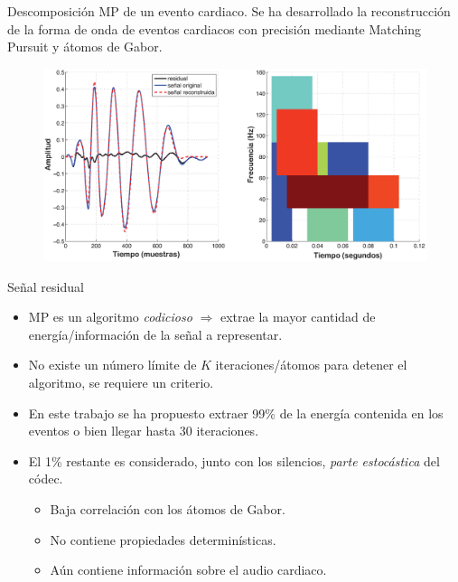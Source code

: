 \documentclass[xcolor=table]{beamer}
\begin{document}
\begin{frame}{Descomposici\'on MP de un evento cardiaco.}
Se ha desarrollado la reconstrucci\'on de la forma de onda de eventos cardiacos 
con precisi\'on mediante Matching Pursuit y \'atomos de Gabor. 
	\begin{figure}
	\centering
	\includegraphics[scale=0.3]{eventoRecons.eps}
	\end{figure}
\end{frame}

\begin{frame}{Se\~nal residual}
	\begin{itemize}
		\item<2-> MP es un algoritmo \emph{codicioso} $\Rightarrow$ extrae la mayor cantidad de energ\'ia/informaci\'on de la se\~nal a representar.
		\item<3-> No existe un n\'umero l\'imite de $K$ iteraciones/\'atomos para detener el algoritmo, se requiere un criterio.
		\item<4-> En este trabajo se ha propuesto extraer 99\% de la energ\'ia contenida en los eventos o  bien llegar hasta 30 iteraciones.
		\item<5-> El 1\% restante es considerado, junto con los silencios, \alert{\emph{parte estoc\'astica}} del c\'odec.
			\begin{itemize}
				\item<6-> Baja correlaci\'on con los \'atomos de Gabor.
				\item<7-> No contiene propiedades determin\'isticas.
				\item<8-> A\'un contiene informaci\'on sobre el audio cardiaco.
			\end{itemize}
	\end{itemize} 
\end{frame}
\end{document}
